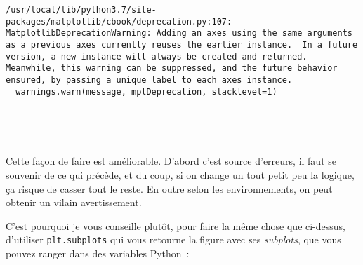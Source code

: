     \begin{Verbatim}[commandchars=\\\{\},frame=single,framerule=0.3mm,rulecolor=\color{cellframecolor}]
/usr/local/lib/python3.7/site-packages/matplotlib/cbook/deprecation.py:107: MatplotlibDeprecationWarning: Adding an axes using the same arguments as a previous axes currently reuses the earlier instance.  In a future version, a new instance will always be created and returned.  Meanwhile, this warning can be suppressed, and the future behavior ensured, by passing a unique label to each axes instance.
  warnings.warn(message, mplDeprecation, stacklevel=1)
\end{Verbatim}

    \begin{center}
    \end{center}
    { \hspace*{\fill} \\}
    
    \begin{center}
    \end{center}
    { \hspace*{\fill} \\}
    
    Cette façon de faire est améliorable. D'abord c'est source d'erreurs, il
faut se souvenir de ce qui précède, et du coup, si on change un tout
petit peu la logique, ça risque de casser tout le reste. En outre selon
les environnements, on peut obtenir un vilain avertissement.

C'est pourquoi je vous conseille plutôt, pour faire la même chose que
ci-dessus, d'utiliser \texttt{plt.subplots} qui vous retourne la figure
avec ses \emph{subplots}, que vous pouvez ranger dans des variables
Python~:

